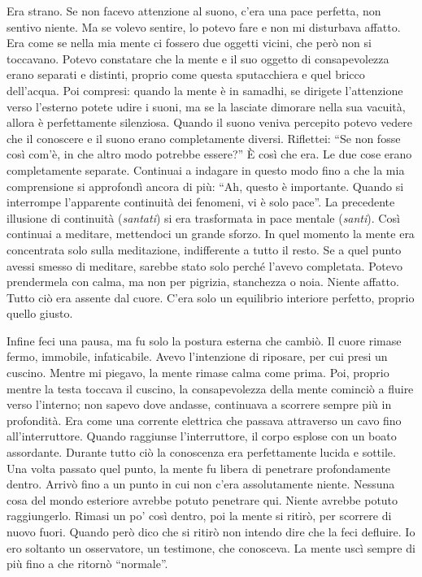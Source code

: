 Era strano. Se non facevo attenzione al suono, c'era una pace perfetta,
non sentivo niente. Ma se volevo sentire, lo potevo fare e non mi
disturbava affatto. Era come se nella mia mente ci fossero due oggetti
vicini, che però non si toccavano. Potevo constatare che la mente e il
suo oggetto di consapevolezza erano separati e distinti, proprio come
questa sputacchiera e quel bricco dell'acqua. Poi compresi: quando la
mente è in samadhi, se dirigete l'attenzione verso l'esterno potete
udire i suoni, ma se la lasciate dimorare nella sua vacuità, allora è
perfettamente silenziosa. Quando il suono veniva percepito potevo vedere
che il conoscere e il suono erano completamente diversi. Riflettei: ``Se
non fosse così com'è, in che altro modo potrebbe essere?'' È così che
era. Le due cose erano completamente separate. Continuai a indagare in
questo modo fino a che la mia comprensione si approfondì ancora di più:
``Ah, questo è importante. Quando si interrompe l'apparente continuità
dei fenomeni, vi è solo pace''. La precedente illusione di continuità
(\emph{santati}) si era trasformata in pace mentale (\emph{santi}). Così
continuai a meditare, mettendoci un grande sforzo. In quel momento la
mente era concentrata solo sulla meditazione, indifferente a tutto il
resto. Se a quel punto avessi smesso di meditare, sarebbe stato solo
perché l'avevo completata. Potevo prendermela con calma, ma non per
pigrizia, stanchezza o noia. Niente affatto. Tutto ciò era assente dal
cuore. C'era solo un equilibrio interiore perfetto, proprio quello
giusto.

Infine feci una pausa, ma fu solo la postura esterna che cambiò. Il
cuore rimase fermo, immobile, infaticabile. Avevo l'intenzione di
riposare, per cui presi un cuscino. Mentre mi piegavo, la mente rimase
calma come prima. Poi, proprio mentre la testa toccava il cuscino, la
consapevolezza della mente cominciò a fluire verso l'interno; non sapevo
dove andasse, continuava a scorrere sempre più in profondità. Era come
una corrente elettrica che passava attraverso un cavo fino
all'interruttore. Quando raggiunse l'interruttore, il corpo esplose con
un boato assordante. Durante tutto ciò la conoscenza era perfettamente
lucida e sottile. Una volta passato quel punto, la mente fu libera di
penetrare profondamente dentro. Arrivò fino a un punto in cui non c'era
assolutamente niente. Nessuna cosa del mondo esteriore avrebbe potuto
penetrare qui. Niente avrebbe potuto raggiungerlo. Rimasi un po' così
dentro, poi la mente si ritirò, per scorrere di nuovo fuori. Quando però
dico che si ritirò non intendo dire che la feci defluire. Io ero
soltanto un osservatore, un testimone, che conosceva. La mente uscì
sempre di più fino a che ritornò ``normale''.

